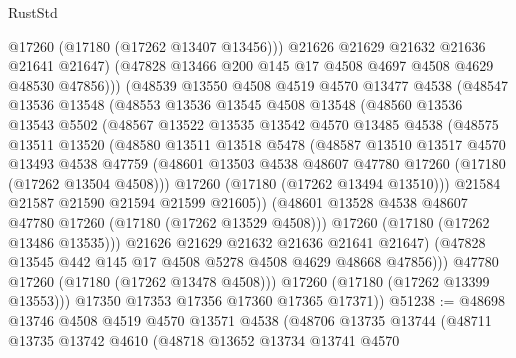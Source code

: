 \begin{lexlean}{RustStd}
\begin{coremodule}
                  @17260
                  (@17180 (@17262 @13407 @13456)))
                @21626
                @21629
                @21632
                @21636
                @21641
                @21647)
              (@47828 @13466 @200 @145 @17 @4508 @4697 @4508 @4629 @48530 @47856)))
          (@48539
            @13550
            @4508
            @4519
            @4570
            @13477
            @4538
            (@48547
              @13536
              @13548
              (@48553
                @13536
                @13545
                @4508
                @13548
                (@48560
                  @13536
                  @13543
                  @5502
                  (@48567
                    @13522
                    @13535
                    @13542
                    @4570
                    @13485
                    @4538
                    (@48575
                      @13511
                      @13520
                      (@48580
                        @13511
                        @13518
                        @5478
                        (@48587
                          @13510
                          @13517
                          @4570
                          @13493
                          @4538
                          @47759
                          (@48601 @13503 @4538 @48607 @47780 @17260 (@17180 (@17262 @13504 @4508)))
                          @17260
                          (@17180 (@17262 @13494 @13510)))
                        @21584
                        @21587
                        @21590
                        @21594
                        @21599
                        @21605))
                    (@48601 @13528 @4538 @48607 @47780 @17260 (@17180 (@17262 @13529 @4508)))
                    @17260
                    (@17180 (@17262 @13486 @13535)))
                  @21626
                  @21629
                  @21632
                  @21636
                  @21641
                  @21647)
                (@47828 @13545 @442 @145 @17 @4508 @5278 @4508 @4629 @48668 @47856)))
            @47780
            @17260
            (@17180 (@17262 @13478 @4508)))
          @17260
          (@17180 (@17262 @13399 @13553)))
        @17350
        @17353
        @17356
        @17360
        @17365
        @17371))
@51238 := @48698
    @13746
    @4508
    @4519
    @4570
    @13571
    @4538
    (@48706
      @13735
      @13744
      (@48711
        @13735
        @13742
        @4610
        (@48718
          @13652
          @13734
          @13741
          @4570

\end{coremodule}
\end{lexlean}
